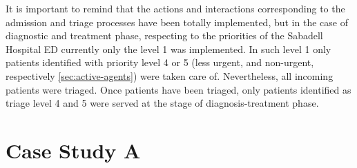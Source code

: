 It is important to remind that the actions and interactions corresponding
to the admission and triage processes have been totally implemented,
but in the case of diagnostic and treatment phase, respecting to the
priorities of the Sabadell Hospital ED currently only the level 1
was implemented. In such level 1 only patients identified with priority
level 4 or 5 (less urgent, and non-urgent, respectively \ref{sec:active-agents})
were taken care of. Nevertheless, all incoming patients were triaged.
Once patients have been triaged, only patients identified as triage
level 4 and 5 were served at the stage of diagnosis-treatment phase.

\section{Case Study A \label{sub:Case-Study-A}}

